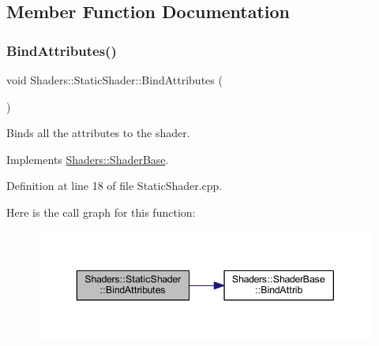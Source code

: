 \subsection{Member Function Documentation}
\mbox{\label{class_shaders_1_1_static_shader_a4ba0a1e7a4d2b58668f97cb9e3892f57}} 
\subsubsection{\texorpdfstring{Bind\+Attributes()}{BindAttributes()}}
{\footnotesize\ttfamily void Shaders\+::\+Static\+Shader\+::\+Bind\+Attributes (\begin{DoxyParamCaption}{ }\end{DoxyParamCaption})\hspace{0.3cm}{\ttfamily [virtual]}}

Binds all the attributes to the shader. 

Implements \hyperlink{class_shaders_1_1_shader_base_a8230f19d72ac58be9db263bbf8436967}{Shaders\+::\+Shader\+Base}.



Definition at line 18 of file Static\+Shader.\+cpp.

Here is the call graph for this function\+:
\nopagebreak
\begin{figure}[H]
\begin{center}
\leavevmode
\includegraphics[width=343pt]{class_shaders_1_1_static_shader_a4ba0a1e7a4d2b58668f97cb9e3892f57_cgraph}
\end{center}
\end{figure}
\mbox{\label{class_shaders_1_1_static_shader_a2417ca33a617fe8a8cb30ec3b5e866fa}} 

